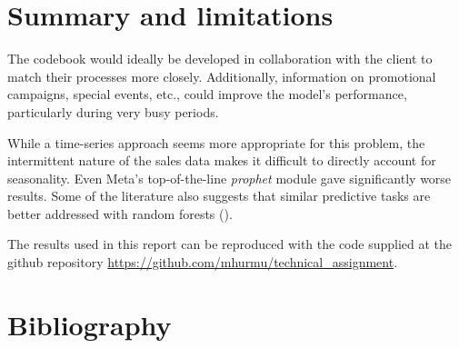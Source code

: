 \documentclass[11pt]{amsart}
\begin{document}
\section{Summary and limitations}
The codebook would ideally be developed in collaboration with the client to match their processes more closely. Additionally, information on promotional campaigns, special events, etc., could improve the model's performance, particularly during very busy periods.

While a time-series approach seems more appropriate for this problem, the intermittent nature of the sales data makes it difficult to directly account for seasonality. Even Meta's top-of-the-line \emph{prophet} module gave significantly worse results. Some of the literature also suggests that similar predictive tasks are better addressed with random forests (\cite{raizada}).

The results used in this report can be reproduced with the code supplied at the github repository \href{https://github.com/mhurmu/technical_assignment}{https://github.com/mhurmu/technical\_assignment}.


\section*{Bibliography}

\begin{biblist}



\end{biblist}
\end{document}

